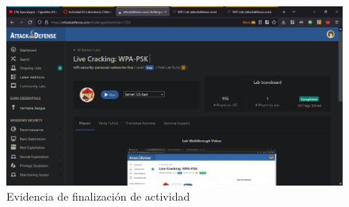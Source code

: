\documentclass{article}
\begin{document}
        \clearpage
        \begin{landscape}
            \begin{figure}[!h]
                \centering
                \includegraphics[scale=0.5]{img/wpa-breaking-after-evidence.png}
                \caption{Evidencia de finalización de actividad}
                \label{fig:wpa-after}
            \end{figure}
        \end{landscape}
\end{document}
